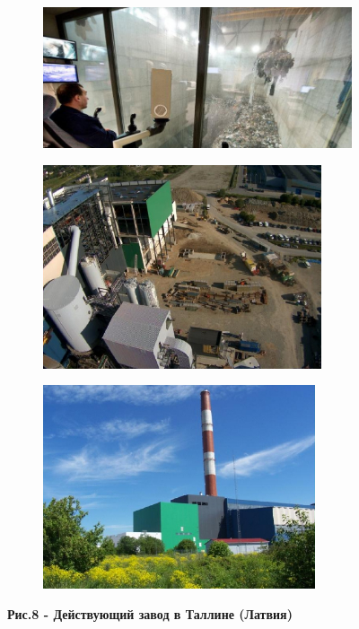 \begin{figure}[H]
    \centering
    \begin{subfigure}[t]{0.9\textwidth}
        \centering
        \includegraphics[width=\textwidth]{media/chem2/image71}
    \end{subfigure}
    \begin{subfigure}[t]{0.45\textwidth}
        \centering
        \includegraphics[width=\textwidth, height=6cm]{media/chem2/image71.1}
    \end{subfigure}
    \hspace{-5pt}
    \begin{subfigure}[t]{0.45\textwidth}
        \centering
        \includegraphics[width=\textwidth, height=6cm]{media/chem2/image71.2}
    \end{subfigure}
    \caption*{{\bfseries Рис.8 - Действующий завод в Таллине (Латвия)}}
\end{figure}

